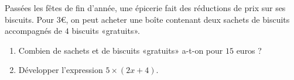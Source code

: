 
\begin{exercice}\label{exo2smath-0087}

Passées les fêtes de fin d'année, une épicerie fait des réductions de prix sur ses biscuits. Pour \( 3\)€, on peut acheter une boîte contenant deux sachets de biscuits accompagnés de \( 4\) biscuits «gratuits».
\begin{enumerate}
    \item
        Combien de sachets et de biscuits «gratuits» a-t-on pour \( 15\) euros ?
    \item
        Développer l'expression \( 5\times(2x+4)\).
\end{enumerate}

\end{exercice}
